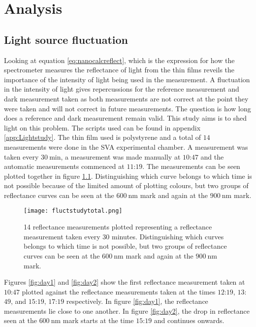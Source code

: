 \documentclass[MasterThesisMain.tex]{subfiles}
\begin{document}
\chapter{Analysis} \label{ch:analysis}

\section{Light source fluctuation}
Looking at equation \ref{eq:nanocalcreflect}, which is the expression for how the spectrometer measures the reflectance of light from the thin films reveils the importance of the intensity of light being used in the measurement. A fluctuation in the intensity of light gives repercussions for the reference measurement and dark measurement taken as both measurements are not correct at the point they were taken and will not correct in future measurements. The question is how long does a reference and dark measurement remain valid. This study aims is to shed light on this problem. The scripts used can be found in appendix \ref{app:Lightstudy}. The thin film used is polystyrene and a total of $14$ measurements were done in the SVA experimental chamber. A measurement was taken every $\SI{30}{\minute}$, a measurement was made manually at $10$:$47$ and the automatic measurements commenced at $11$:$19$. The measurements can be seen plotted together in figure \ref{fig:daytotal}. Distinguishing which curve belongs to which time is not possible because of the limited amount of plotting colours, but two groups of reflectance curves can be seen at the $\SI{600}{\nano\meter}$ mark and again at the $\SI{900}{\nano\meter}$ mark.
  
\begin{figure}
\centering
\texttt{[image: fluctstudytotal.png]}
\caption{14 reflectance measurements plotted representing a reflectance measurement taken every $30$ minutes. Distinguishing which curves belongs to which time is not possible, but two groups of reflectance curves can be seen at the $\SI{600}{\nano\meter}$ mark and again at the $\SI{900}{\nano\meter}$ mark.}
\label{fig:daytotal}
\end{figure}

Figures \ref{fig:day1} and \ref{fig:day2} show the first reflectance measurement taken at $10$:$47$ plotted against the reflectance measurements taken at the times $12$:$19$, $13$:$49$, and $15$:$19$, $17$:$19$ respectively. In figure \ref{fig:day1}, the reflectance measurements lie close to one another. In figure \ref{fig:day2}, the drop in reflectance seen at the $\SI{600}{\nano\meter}$ mark starts at the time $15$:$19$ and continues onwards. 
\end{document}
